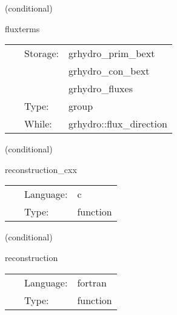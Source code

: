 \vspace{5mm}

   (conditional) 

\hspace{5mm} fluxterms 

\hspace{5mm}{\it calculation of intercell fluxes } 


\hspace{5mm}

 \begin{tabular*}{160mm}{cll} 
~ & Storage:  & grhydro\_prim\_bext \\ 
~& ~ &grhydro\_con\_bext\\ 
~& ~ &grhydro\_fluxes\\ 
~ & Type:  & group \\ 
~ & While:  & grhydro::flux\_direction \\ 
\end{tabular*} 


\vspace{5mm}

   (conditional) 

\hspace{5mm} reconstruction\_cxx 

\hspace{5mm}{\it reconstruct the functions at the cell boundaries } 


\hspace{5mm}

 \begin{tabular*}{160mm}{cll} 
~ & Language:  & c \\ 
~ & Type:  & function \\ 
\end{tabular*} 


\vspace{5mm}

   (conditional) 

\hspace{5mm} reconstruction 

\hspace{5mm}{\it reconstruct the functions at the cell boundaries } 


\hspace{5mm}

 \begin{tabular*}{160mm}{cll} 
~ & Language:  & fortran \\ 
~ & Type:  & function \\ 
\end{tabular*} 


